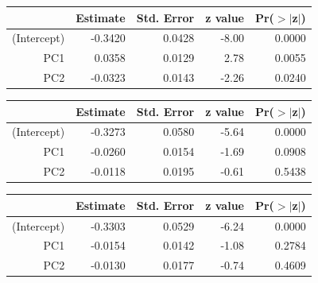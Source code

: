 \documentclass[a4paper,12pt]{Latex/Classes/PhDthesisPSnPDF}
\begin{document}
\begin{center}
\begin{table}[ht]
\centering
\begin{tabular}{rrrrr}
  \hline
 & Estimate & Std. Error & z value & Pr($>$$|$z$|$) \\ 
  \hline
(Intercept) & -0.3420 & 0.0428 & -8.00 & 0.0000 \\ 
  PC1 & 0.0358 & 0.0129 & 2.78 & 0.0055 \\ 
  PC2 & -0.0323 & 0.0143 & -2.26 & 0.0240 \\ 
   \hline
\end{tabular}
\end{table}\end{center}

\newpage

\begin{center}
\begin{table}[ht]
\centering
\begin{tabular}{rrrrr}
  \hline
 & Estimate & Std. Error & z value & Pr($>$$|$z$|$) \\ 
  \hline
(Intercept) & -0.3273 & 0.0580 & -5.64 & 0.0000 \\ 
  PC1 & -0.0260 & 0.0154 & -1.69 & 0.0908 \\ 
  PC2 & -0.0118 & 0.0195 & -0.61 & 0.5438 \\ 
   \hline
\end{tabular}
\end{table}\end{center}

\begin{center}
\begin{table}[ht]
\centering
\begin{tabular}{rrrrr}
  \hline
 & Estimate & Std. Error & z value & Pr($>$$|$z$|$) \\ 
  \hline
(Intercept) & -0.3303 & 0.0529 & -6.24 & 0.0000 \\ 
  PC1 & -0.0154 & 0.0142 & -1.08 & 0.2784 \\ 
  PC2 & -0.0130 & 0.0177 & -0.74 & 0.4609 \\ 
   \hline
\end{tabular}
\end{table}\end{center}
\end{document}
